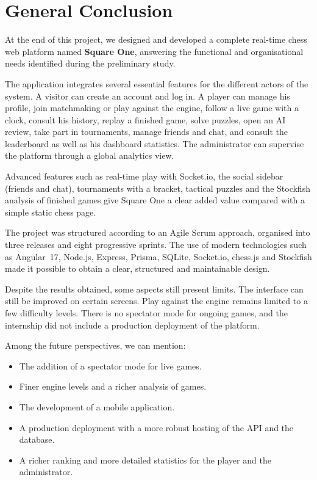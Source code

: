 \documentclass[12pt,a4paper,oneside]{report}
\begin{document}
\chapter*{General Conclusion}

At the end of this project, we designed and developed a complete real-time chess web platform named \textbf{Square One}, answering the functional and organisational needs identified during the preliminary study.

The application integrates several essential features for the different actors of the system. A visitor can create an account and log in. A player can manage his profile, join matchmaking or play against the engine, follow a live game with a clock, consult his history, replay a finished game, solve puzzles, open an AI review, take part in tournaments, manage friends and chat, and consult the leaderboard as well as his dashboard statistics. The administrator can supervise the platform through a global analytics view.

Advanced features such as real-time play with Socket.io, the social sidebar (friends and chat), tournaments with a bracket, tactical puzzles and the Stockfish analysis of finished games give Square One a clear added value compared with a simple static chess page.

The project was structured according to an Agile Scrum approach, organised into three releases and eight progressive sprints. The use of modern technologies such as Angular~17, Node.js, Express, Prisma, SQLite, Socket.io, chess.js and Stockfish made it possible to obtain a clear, structured and maintainable design.

Despite the results obtained, some aspects still present limits. The interface can still be improved on certain screens. Play against the engine remains limited to a few difficulty levels. There is no spectator mode for ongoing games, and the internship did not include a production deployment of the platform.

Among the future perspectives, we can mention:
\begin{itemize}[leftmargin=1.4em]
  \item The addition of a spectator mode for live games.
  \item Finer engine levels and a richer analysis of games.
  \item The development of a mobile application.
  \item A production deployment with a more robust hosting of the API and the database.
  \item A richer ranking and more detailed statistics for the player and the administrator.
\end{itemize}
\end{document}
